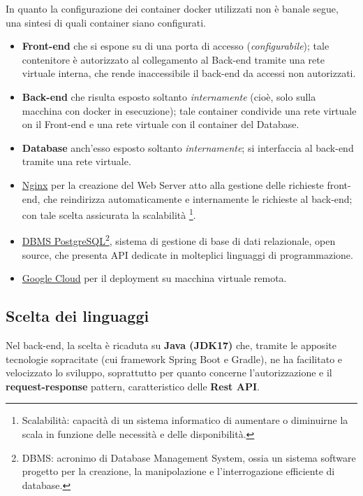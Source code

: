 	\begin{info}
		In quanto la configurazione dei container docker utilizzati non è banale segue, una sintesi di quali container siano configurati.
		
		\begin{itemize}
			\item \textbf{Front-end} che si espone su di una porta di accesso (\textit{configurabile}); tale contenitore è autorizzato al collegamento
			al Back-end tramite una rete virtuale interna, che rende inaccessibile il back-end da accessi non autorizzati.
			\item \textbf{Back-end} che risulta esposto soltanto \textit{internamente} (cioè, solo sulla macchina con docker in esecuzione);
			tale container condivide una rete virtuale on il Front-end e una rete virtuale con il container del Database.
			\item \textbf{Database} anch'esso esposto soltanto \textit{internamente}; si interfaccia al back-end tramite una rete virtuale.
		\end{itemize}
	\end{info}

	\begin{itemize}[resume]
		\item \href{https://www.nginx.com/}{Nginx} per la creazione del Web Server atto alla gestione delle richieste front-end, 
		che reindirizza automaticamente e internamente le richieste al back-end; con tale scelta assicurata la \newline scalabilità
		\footnote{Scalabilità: capacità di un sistema informatico di aumentare o diminuirne la scala in funzione delle necessità e delle disponibilità.}.
		\item \href{https://www.postgresql.org/}{DBMS PostgreSQL}\footnote{DBMS: acronimo di Database Management System, ossia un sistema software progetto per la creazione, la manipolazione e l'interrogazione efficiente di database.}, 
		sistema di gestione di base di dati relazionale, open source, che presenta API dedicate in molteplici linguaggi di programmazione.
		\item \href{https://cloud.google.com}{Google Cloud} per il deployment su macchina virtuale remota.
	\end{itemize}

	\newpage
	\subsection{Scelta dei linguaggi}
	Nel back-end, la scelta è ricaduta su \textbf{Java (JDK17)} che, tramite le apposite tecnologie sopracitate (cui framework Spring Boot e Gradle), ne ha facilitato
	e velocizzato lo sviluppo, soprattutto per quanto concerne l'autorizzazione e il \textbf{request-response} pattern\footnotemark, caratteristico delle \textbf{Rest API}.

